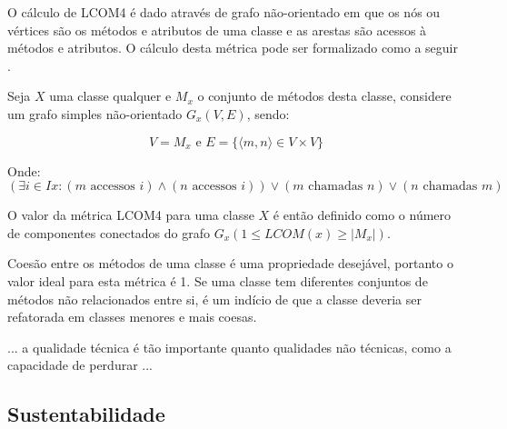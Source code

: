 \begin{itemize}
O cálculo de LCOM4 é dado através de grafo não-orientado em que os nós ou
vértices são os métodos e atributos de uma classe e as arestas são acessos à
métodos e atributos. O cálculo desta métrica pode ser formalizado como a
seguir \cite{Silva2012}.

Seja $ X $ uma classe qualquer e $ M_x $ o conjunto de métodos desta classe,
considere um grafo simples não-orientado $ G_x(V, E) $, sendo:

\begin{equation}
V = M_x
\text{ e }
E = \{ \langle m, n \rangle \in V \times V \}
\end{equation}

Onde:
\begin{equation}
(\exists i \in Ix : (m \text{ accessos } i) \land (n \text{ accessos } i)) \lor (m \text{ chamadas } n) \lor (n \text{ chamadas } m)
\end{equation}

O valor da métrica LCOM4 para uma classe $ X $ é então definido como o número
de componentes conectados do grafo $ G_x (1 \leq LCOM(x) \geq | M_x |)$.

Coesão entre os métodos de uma classe é uma propriedade desejável, portanto o
valor ideal para esta métrica é 1. Se uma classe tem diferentes conjuntos de
métodos não relacionados entre si, é um indício de que a classe deveria ser
refatorada em classes menores e mais coesas.

\end{itemize}

... a qualidade técnica é tão importante quanto qualidades não técnicas, como
a capacidade de perdurar ...

\subsection{Sustentabilidade} \label{sustentabilidade}

%
%

